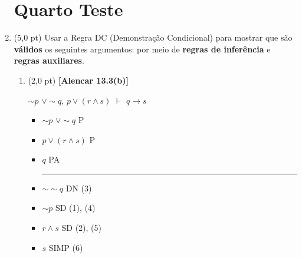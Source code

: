 \documentclass[12pt,a4paper,oneside]{article}
\begin{document}
\begin{enumerate}
	
	\section*{Quarto Teste}
	
	\item (5,0 pt) Usar a Regra DC (Demonstração Condicional) para mostrar que são {\bf válidos} os seguintes argumentos: por meio de {\bf regras de inferência} e {\bf regras auxiliares}.
	\begin{enumerate}
		\item (2,0 pt) {\bf [Alencar 13.3(b)]} 
		\begin{center}
			$\sim p$ $\vee \sim q$, $p \vee (r \wedge s)$ $\vdash$ $q \rightarrow s$
		\end{center}
		{\color{blue}
			\begin{itemize}
				\item[(1)] $\sim p$ $\vee \sim q$ \hspace*{1.1cm} P
				\item[(2)] $p \vee (r \wedge s)$ \hspace*{1.1cm} P
				\item[(3)] $q$ \hspace*{2.6cm} PA\\
				\rule{3cm}{0.5pt}
				\item[(4)] $\sim \sim q$ \hspace*{1.0cm} DN (3)
				\item[(5)] $\sim p$ \hspace*{1.3cm} SD (1), (4)
				\item[(6)] $r \wedge s$ \hspace*{1.1cm} SD (2), (5)
				\item[(7)] $s$ \hspace*{1.7cm} SIMP (6)
			\end{itemize}
		}
		\vspace*{0.3cm}
		

\end{enumerate}
\end{enumerate}
\end{document}
